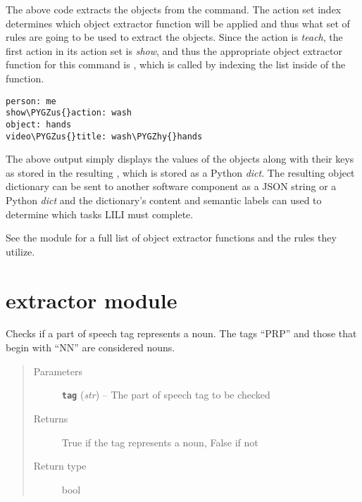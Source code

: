 \documentclass[letterpaper,10pt,english]{sphinxmanual}
\def\PYGZus{\char`\_}
\def\PYGZhy{\char`\-}
\begin{document}
The above code extracts the objects from the command. The action set index determines which object extractor function will be applied and thus what set of rules are going to be used to extract the objects. Since the action is \emph{teach}, the first action in its action set is \emph{show}, and thus the appropriate object extractor function for this command is {\hyperref[extractor:interpreter.extractor.object_dict_show]{\emph{}}}, which is called by indexing the  list inside of the {\hyperref[interpreter:interpreter.interpreter.generate_object_dict]{\emph{}}} function.

\begin{Verbatim}[commandchars=\\\{\}]
person: me
show\PYGZus{}action: wash
object: hands
video\PYGZus{}title: wash\PYGZhy{}hands
\end{Verbatim}

The above output simply displays the values of the objects along with their keys as stored in the resulting {\hyperref[terms:object-dictionary]{\emph{}}}, which is stored as a Python \emph{dict}. The resulting object dictionary can be sent to another software component as a JSON string or a Python \emph{dict} and the dictionary's content and semantic labels can used to determine which tasks LILI must complete.

See the {\hyperref[extractor:module-interpreter.extractor]{\emph{}}} module for a full list of object extractor functions and the rules they utilize.


\chapter{extractor module}
\label{extractor:extractor-module}\label{extractor::doc}\label{extractor:module-interpreter.extractor}

\begin{fulllineitems}
\label{extractor:interpreter.extractor.is_noun}
Checks if a part of speech tag represents a noun. The tags ``PRP'' and those that begin with ``NN'' are considered nouns.
\begin{quote}\begin{description}
\item[{Parameters}] \leavevmode
\textbf{\texttt{tag}} (\emph{str}) -- The part of speech tag to be checked

\item[{Returns}] \leavevmode
True if the tag represents a noun, False if not

\item[{Return type}] \leavevmode
bool

\end{description}\end{quote}

\end{fulllineitems}
\end{document}
